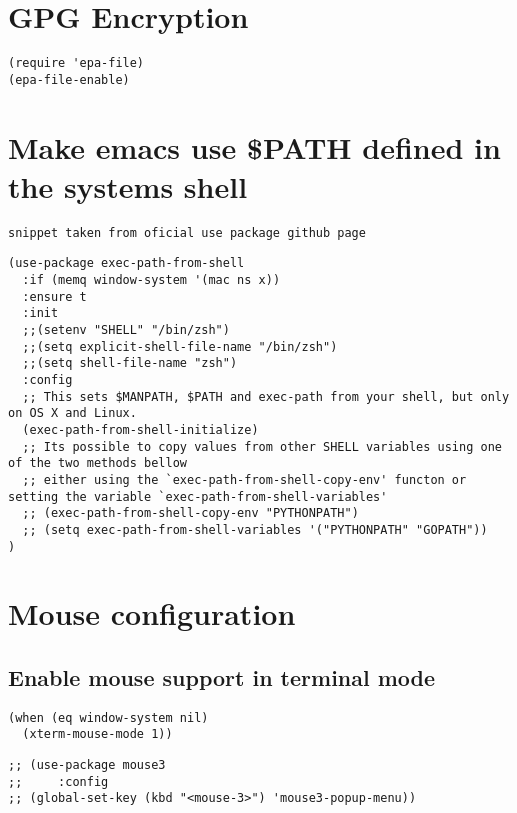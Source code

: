 \documentclass[11pt]{article}
\begin{document}
\section*{GPG Encryption}
\label{sec:orgef09588}

\begin{verbatim}
(require 'epa-file)
(epa-file-enable)
\end{verbatim}

\section*{Make emacs use \$PATH defined in the systems shell}
\label{sec:org0a9bc6c}

\begin{verbatim}
snippet taken from oficial use package github page
\end{verbatim}

\begin{verbatim}
(use-package exec-path-from-shell
  :if (memq window-system '(mac ns x))
  :ensure t
  :init
  ;;(setenv "SHELL" "/bin/zsh")
  ;;(setq explicit-shell-file-name "/bin/zsh")
  ;;(setq shell-file-name "zsh")
  :config
  ;; This sets $MANPATH, $PATH and exec-path from your shell, but only on OS X and Linux.
  (exec-path-from-shell-initialize)
  ;; Its possible to copy values from other SHELL variables using one of the two methods bellow
  ;; either using the `exec-path-from-shell-copy-env' functon or setting the variable `exec-path-from-shell-variables'
  ;; (exec-path-from-shell-copy-env "PYTHONPATH")
  ;; (setq exec-path-from-shell-variables '("PYTHONPATH" "GOPATH"))
)
\end{verbatim}

\section*{Mouse configuration}
\label{sec:org8868556}
\subsection*{Enable mouse support in terminal mode}
\label{sec:org62deb26}

\begin{verbatim}
(when (eq window-system nil)
  (xterm-mouse-mode 1))
\end{verbatim}

\begin{verbatim}
;; (use-package mouse3
;;     :config
;; (global-set-key (kbd "<mouse-3>") 'mouse3-popup-menu))
\end{verbatim}
\end{document}
